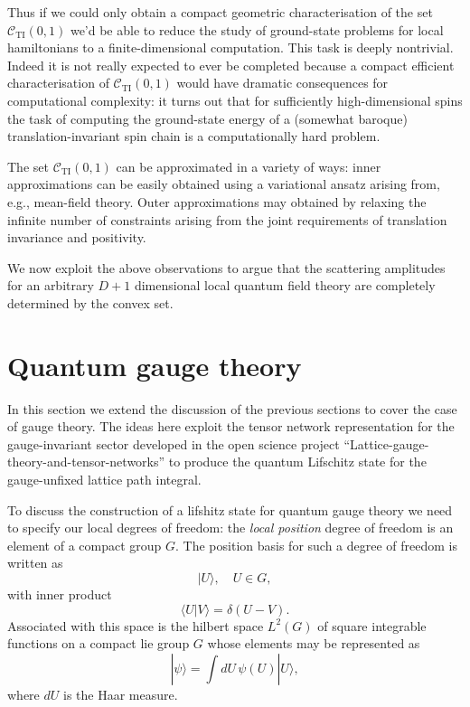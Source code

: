 \documentclass[twocolumn,lengthcheck,superscriptaddress]{revtex4-1}
\theoremstyle{definition}
\theoremstyle{remark}
\begin{document}
Thus if we could only obtain a compact geometric characterisation of the set $\mathcal{C}_{\text{TI}}(0,1)$ we'd be able to reduce the study of ground-state problems for local hamiltonians to a finite-dimensional computation. This task is deeply nontrivial. Indeed it is not really expected to ever be completed because a compact efficient characterisation of $\mathcal{C}_{\text{TI}}(0,1)$ would have dramatic consequences for computational complexity: it turns out that for sufficiently high-dimensional spins the task of computing the ground-state energy of a (somewhat baroque) translation-invariant spin chain is a computationally hard problem. 

The set $\mathcal{C}_{\text{TI}}(0,1)$ can be approximated in a variety of ways: inner approximations can be easily obtained using a variational ansatz arising from, e.g., mean-field theory. Outer approximations may obtained by relaxing the infinite number of constraints arising from the joint requirements of translation invariance and positivity. 

We now exploit the above observations to argue that the scattering amplitudes for an arbitrary $D+1$ dimensional local quantum field theory are completely determined by the convex set. 

\section{Quantum gauge theory}
In this section we extend the discussion of the previous sections to cover the case of gauge theory. The ideas here exploit the tensor network representation for the gauge-invariant sector developed in the open science project ``Lattice-gauge-theory-and-tensor-networks'' to produce the quantum Lifschitz state for the gauge-unfixed lattice path integral.

To discuss the construction of a lifshitz state for quantum gauge theory we need to specify our local degrees of freedom: the \emph{local position} degree of freedom is an element of a compact group $G$. The position basis for such a degree of freedom is written as  
\begin{equation}
	|U\rangle, \quad U\in G,
\end{equation}
with inner product
\begin{equation}
	\langle U|V\rangle = \delta(U-V).
\end{equation}
Associated with this space is the hilbert space $L^2(G)$ of square integrable functions on a compact lie group $G$ whose elements may be represented as
\begin{equation}
	|\psi\rangle = \int dU\, \psi(U)|U\rangle,
\end{equation}
where $dU$ is the Haar measure. 
\end{document}
